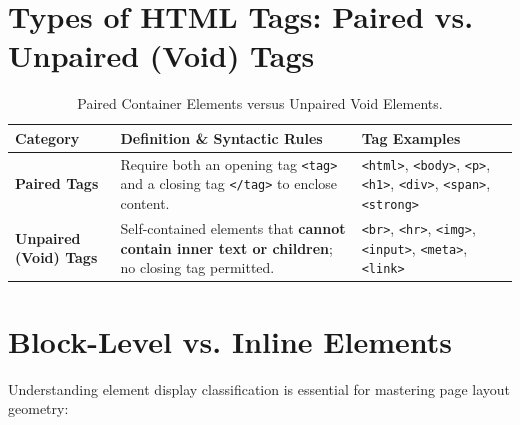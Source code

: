 \section{Types of HTML Tags: Paired vs. Unpaired (Void) Tags}

\begin{table}[htbp]
\centering
\small
\renewcommand{\arraystretch}{1.3}
\begin{tabularx}{\linewidth}{l>{\raggedright\arraybackslash}Xl}
\toprule
\textbf{Category} & \textbf{Definition \& Syntactic Rules} & \textbf{Tag Examples} \\
\midrule
\textbf{Paired Tags} & Require both an opening tag \texttt{<tag>} and a closing tag \texttt{</tag>} to enclose content. & \texttt{<html>}, \texttt{<body>}, \texttt{<p>}, \texttt{<h1>}, \texttt{<div>}, \texttt{<span>}, \texttt{<strong>} \\
\textbf{Unpaired (Void) Tags} & Self-contained elements that \textbf{cannot contain inner text or children}; no closing tag permitted. & \texttt{<br>}, \texttt{<hr>}, \texttt{<img>}, \texttt{<input>}, \texttt{<meta>}, \texttt{<link>} \\
\bottomrule
\end{tabularx}
\caption{Paired Container Elements versus Unpaired Void Elements.}
\label{tab:paired-vs-unpaired}
\end{table}

\section{Block-Level vs. Inline Elements}

Understanding element display classification is essential for mastering page layout geometry:

